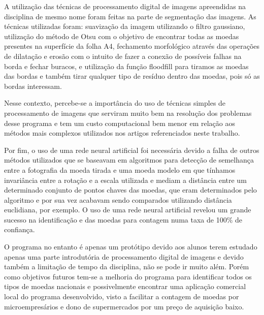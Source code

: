 \documentclass[10pt,journal,compsoc]{IEEEtran}
\begin{document}
A utilização das técnicas de processamento digital de imagens apreendidas na disciplina de mesmo nome foram feitas na parte de segmentação das imagens. As técnicas utilizadas foram: suavização da imagem utilizando o filtro gaussiano, utilização do método de Otsu com o objetivo de encontrar todas as moedas presentes na superfície da folha A4, fechamento morfológico através das operações de dilatação e erosão com o intuito de fazer a conexão de possíveis falhas na borda e fechar buracos, e utilização da função floodfill para tiramos as moedas das bordas e também tirar qualquer tipo de resíduo dentro das moedas, pois só as bordas interessam.

Nesse contexto, percebe-se a importância do uso de técnicas simples de processamento de imagens que serviram muito bem na resolução dos problemas desse programa e tem um custo computacional bem menor em relação aos métodos mais complexos utilizados nos artigos referenciados neste trabalho.

Por fim, o uso de uma rede neural artificial foi necessária devido a falha de outros métodos utilizados que se baseavam em algoritmos para detecção de semelhança entre a fotografia da moeda tirada e uma moeda modelo em que tínhamos invariância entre a rotação e a escala utilizada e mediam a distância entre um determinado conjunto de pontos chaves das moedas, que eram determinados pelo algoritmo e por sua vez acabavam sendo comparados utilizando distância euclidiana, por exemplo. O uso de uma rede neural artificial revelou um grande sucesso na identificação e das moedas para contagem numa taxa de 100$\%$ de confiança.

O programa no entanto é apenas um protótipo devido aos alunos terem estudado apenas uma parte introdutória de processamento digital de imagens e devido também a limitação de tempo da disciplina, não se pode ir muito além. Porém como objetivos futuros tem-se a melhoria do programa para identificar todos os tipos de moedas nacionais e possivelmente encontrar uma aplicação comercial local do programa desenvolvido, visto a facilitar a contagem de moedas por microempresários e dono de supermercados por um preço de aquisição baixo.  

\medskip



\end{document}
